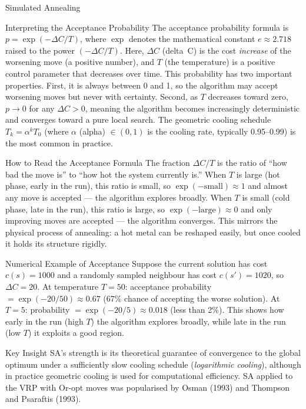 \documentclass[aspectratio=169,10pt]{beamer}
\begin{document}
\begin{frame}[allowframebreaks]{Simulated Annealing}
  \begin{block}{Interpreting the Acceptance Probability}
    The acceptance probability formula is $p = \exp(-\Delta C / T)$, where
    $\exp$ denotes the mathematical constant $e \approx 2.718$ raised to
    the power $(-\Delta C / T)$.  Here, $\Delta C$ (delta~C) is the cost
    \emph{increase} of the worsening move (a positive number), and $T$
    (the temperature) is a positive control parameter that decreases over
    time.  This probability has two important properties.  First, it is
    always between 0 and 1, so the algorithm may accept worsening moves
    but never with certainty.  Second, as $T$ decreases toward zero,
    $p \to 0$ for any $\Delta C > 0$, meaning the algorithm becomes
    increasingly deterministic and converges toward a pure local search.
    The geometric cooling schedule $T_k = \alpha^k T_0$ (where $\alpha$
    (alpha) $\in (0,1)$ is the cooling rate, typically 0.95--0.99) is
    the most common in practice.
  \end{block}

  \begin{alertblock}{How to Read the Acceptance Formula}
    The fraction $\Delta C / T$ is the ratio of ``how bad the move is''
    to ``how hot the system currently is.''  When $T$ is large (hot
    phase, early in the run), this ratio is small, so $\exp(-\text{small})
    \approx 1$ and almost any move is accepted --- the algorithm explores
    broadly.  When $T$ is small (cold phase, late in the run), this ratio
    is large, so $\exp(-\text{large}) \approx 0$ and only improving moves
    are accepted --- the algorithm converges.  This mirrors the physical
    process of annealing: a hot metal can be reshaped easily, but once
    cooled it holds its structure rigidly.
  \end{alertblock}

  \begin{exampleblock}{Numerical Example of Acceptance}
    Suppose the current solution has cost $c(s) = 1000$ and a randomly
    sampled neighbour has cost $c(s') = 1020$, so $\Delta C = 20$.
    At temperature $T = 50$: acceptance probability $= \exp(-20/50)
    \approx 0.67$ (67\% chance of accepting the worse solution).
    At $T = 5$: probability $= \exp(-20/5) \approx 0.018$ (less than 2\%).
    This shows how early in the run (high $T$) the algorithm explores
    broadly, while late in the run (low $T$) it exploits a good region.
  \end{exampleblock}

  \begin{alertblock}{Key Insight}
    SA's strength is its theoretical guarantee of convergence to the
    global optimum under a sufficiently slow cooling schedule
    (\emph{logarithmic cooling}), although in practice geometric cooling
    is used for computational efficiency.  SA applied to the VRP with
    Or-opt moves was popularised by Osman (1993) and Thompson and
    Psaraftis (1993).
  \end{alertblock}

\end{frame}
\end{document}
